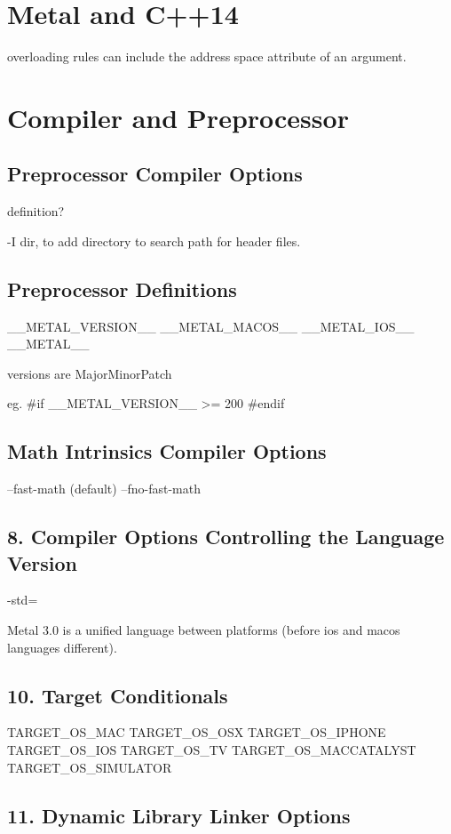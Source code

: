 
\section{Metal and C++14}

overloading rules can include the address space attribute of an argument.



\section{Compiler and Preprocessor}

\subsection{Preprocessor Compiler Options}
definition?

-I dir, to add directory to search path for header files. 


\subsection{Preprocessor Definitions}

__METAL_VERSION__
__METAL_MACOS__
__METAL_IOS__
__METAL__

versions are MajorMinorPatch

eg.
#if __METAL_VERSION__ >= 200
#endif

\subsection{Math Intrinsics Compiler Options}

--fast-math (default)
--fno-fast-math


\subsection{8. Compiler Options Controlling the Language Version}
-std=

Metal 3.0 is a unified language between platforms (before ios and macos languages different).

\subsection{10. Target Conditionals}
TARGET_OS_MAC
TARGET_OS_OSX
TARGET_OS_IPHONE
TARGET_OS_IOS
TARGET_OS_TV
TARGET_OS_MACCATALYST
TARGET_OS_SIMULATOR

\subsection{11. Dynamic Library Linker Options}

